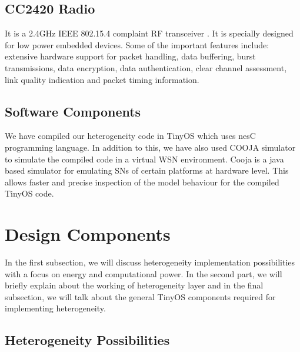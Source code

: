     \subsection*{CC2420 Radio}
    
    It is a 2.4GHz IEEE 802.15.4 complaint RF transceiver  \cite{TI:cc2420}. It is specially designed for low power embedded devices. Some of the important features include: extensive hardware support for packet handling, data buffering, burst transmissions, data encryption, data authentication, clear channel assessment, link quality indication and packet timing information.
    
    \subsection{Software Components}
    
    We have compiled our heterogeneity code in TinyOS which uses nesC programming language. In addition to this, we have also used COOJA simulator \cite{cooja:Contiki} to simulate the compiled code in a virtual \ac{WSN} environment. Cooja is a java based simulator for emulating \acp{SN} of certain platforms at hardware level. This allows faster and precise inspection of the model behaviour for the compiled TinyOS code.

\section{Design Components} \label{sec:DesignComponents}
In the first subsection, we will discuss heterogeneity implementation possibilities with a focus on energy and computational power. In the second part, we will briefly explain about the working of heterogeneity layer and in the final subsection, we will talk about the general TinyOS components required for implementing heterogeneity.

    \subsection{Heterogeneity Possibilities}
    
